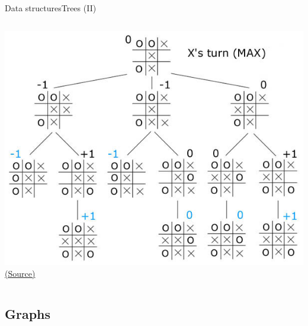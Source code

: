 \documentclass[10pt,compress]{beamer} %
\begin{document}
\begin{frame}{Data structures}{Trees (II)}
\begin{columns}
	   	\begin{center}
		\includegraphics[width=\linewidth]{figs/raya.png}\\
		\tiny{\href{http://www.ocf.berkeley.edu/~yosenl/extras/alphabeta/alphabeta.html}{(Source)}}
	   	\end{center}
		\end{columns}
\end{frame}

\subsection{Graphs}
\end{document}
